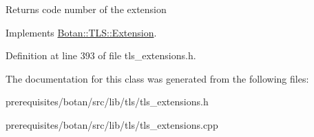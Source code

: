 \begin{DoxyReturn}{Returns}
code number of the extension 
\end{DoxyReturn}


Implements \mbox{\hyperlink{class_botan_1_1_t_l_s_1_1_extension_ac8819b312ce604453225e7b4f7c373ec}{Botan\+::\+T\+L\+S\+::\+Extension}}.



Definition at line 393 of file tls\+\_\+extensions.\+h.



The documentation for this class was generated from the following files\+:\begin{DoxyCompactItemize}
\item 
prerequisites/botan/src/lib/tls/tls\+\_\+extensions.\+h\item 
prerequisites/botan/src/lib/tls/tls\+\_\+extensions.\+cpp\end{DoxyCompactItemize}
